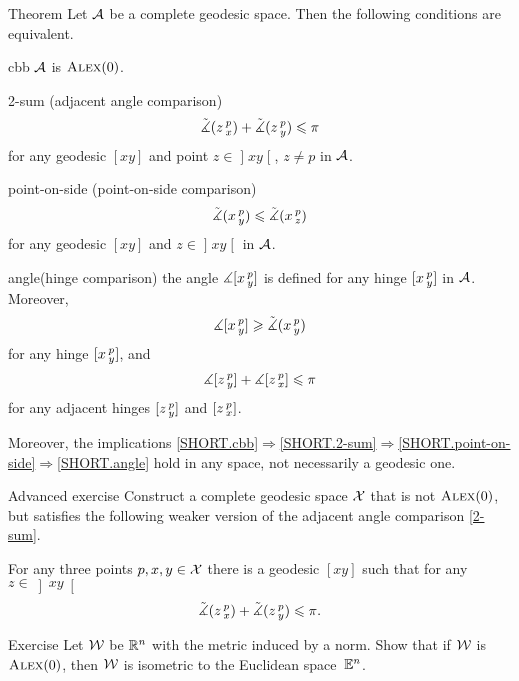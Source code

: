 \begin{thm}{Theorem}\label{thm:defs_of_alex} 
Let $\mathcal{A}$ be a complete geodesic space.
Then the following conditions are equivalent.

\begin{subthm}{cbb}
$\mathcal{A}$ is $\textsc{Alex}(0)$.
\end{subthm}
 

\begin{subthm}{2-sum} 
(adjacent angle comparison)
\[\tilde\measuredangle(z\,{}^{p}_{x})
+\tilde\measuredangle(z\,{}^{p}_{y})\leqslant \pi\]
for any geodesic $[x y]$ and point $z\in \mathopen{]}x y\mathclose{[}$, $z\ne p$ in $\mathcal{A}$.
\end{subthm}

\begin{subthm}{point-on-side}
(point-on-side comparison)
\[\tilde\measuredangle(x\,{}^{p}_{y})\leqslant\tilde\measuredangle(x\,{}^{p}_{z})\]
for any geodesic $[x y]$ and $z\in \mathopen{]}x y\mathclose{[}$ in $\mathcal{A}$.
\end{subthm}

\begin{subthm}{angle}(hinge comparison)
the angle $\measuredangle[x\,{}^{p}_{y}]$ is defined for any hinge $[x\,{}^{p}_{y}]$ in $\mathcal{A}$.
Moreover, 
\[\measuredangle[x\,{}^{p}_{y}]\geqslant\tilde\measuredangle(x\,{}^{p}_{y})\]
for any hinge $[x\,{}^{p}_{y}]$, and
\[\measuredangle[z\,{}^{p}_{y}] + \measuredangle[z\,{}^{p}_{x}]\leqslant\pi\]
for any adjacent hinges $[z\,{}^{p}_{y}]$ and $[z\,{}^{p}_{x}]$.
\end{subthm}

Moreover, the implications \ref{SHORT.cbb}$\Rightarrow$\ref{SHORT.2-sum}$\Rightarrow$\ref{SHORT.point-on-side}$\Rightarrow$\ref{SHORT.angle} hold in any space, not necessarily a geodesic one.
\end{thm}

\begin{thm}{Advanced exercise}\label{ex:urysohn}
Construct a complete geodesic space $\mathcal{X}$ that is not $\textsc{Alex}(0)$, but satisfies the following weaker version of the adjacent angle comparison \ref{2-sum}.

For any three points $p,x,y\in \mathcal{X}$ there is a geodesic $[x y]$ such that for any $z\in \left]x y\right[$
\[\tilde\measuredangle(z\,{}^{p}_{x})+\tilde\measuredangle(z\,{}^{p}_{y})
\leqslant
\pi.\]
\end{thm}

\begin{thm}{Exercise}\label{ex:normCBB}
Let $\mathcal{W}$ be $\mathbb{R}^n$ with the metric induced by a norm.
Show that if $\mathcal{W}$ is $\textsc{Alex}(0)$, then $\mathcal{W}$ is isometric to the Euclidean space~$\mathbb{E}^n$.
\end{thm}

